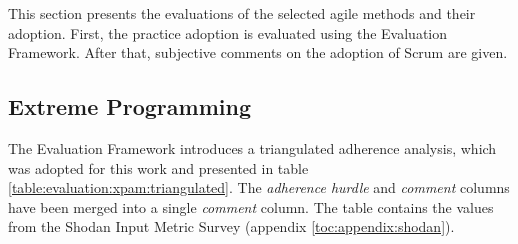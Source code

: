This section presents the evaluations of the selected agile methods 
and their adoption. First, the  practice adoption is 
evaluated using the  Evaluation Framework. After that, 
subjective comments on the adoption of Scrum are given.


\subsection{Extreme Programming}
\label{toc:result:agile:xp}

The  Evaluation Framework \citep{xpevaluationfw} introduces 
a triangulated  adherence analysis, which was adopted for 
this work and presented in table 
\ref{table:evaluation:xpam:triangulated}. The \textsl{adherence 
hurdle} and \textsl{comment} columns have been merged into a single 
\textsl{comment} column. The table contains the values from the Shodan 
Input Metric Survey (appendix \ref{toc:appendix:shodan}).

